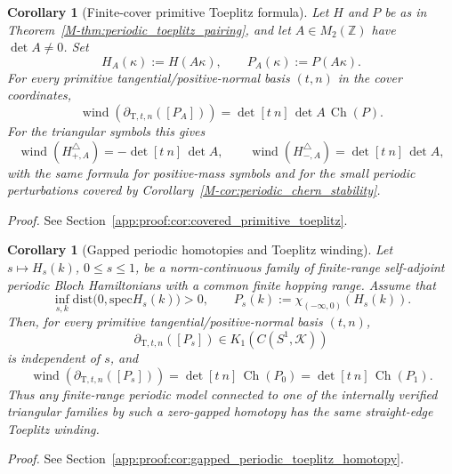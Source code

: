 \documentclass[11pt]{article}
\numberwithin{equation}{section}
\newtheorem{corollary}[theorem]{Corollary}
\theoremstyle{definition}
\theoremstyle{remark}
\newcommand{\proofref}[1]{%
  \par\noindent\emph{Proof.} See Section~\ref{#1}.\par\medskip
}
\newcommand{\proofappendixref}[1]{\proofref{#1}}
\newcommand{\spec}{\mathrm{spec}}
\newcommand{\dist}{\mathrm{dist}}
\newcommand{\Ch}{\operatorname{Ch}}
\begin{document}
\begin{corollary}[Finite-cover primitive Toeplitz formula]\label{cor:covered_primitive_toeplitz}
Let \(H\) and \(P\) be as in Theorem~\ref{M-thm:periodic_toeplitz_pairing}, and let
\(A\in M_2(\mathbb Z)\) have \(\det A\ne0\). Set
\[
H_A(\kappa):=H(A\kappa),\qquad P_A(\kappa):=P(A\kappa).
\]
For every primitive tangential/positive-normal basis \((t,n)\) in the cover coordinates,
\[
\operatorname{wind}\!\left(\partial_{\mathrm T,t,n}([P_A])\right)
=
\det[t\ n]\,\det A\,\Ch(P).
\]
For the triangular symbols this gives
\[
\operatorname{wind}(H^\triangle_{+,A})=-\det[t\ n]\,\det A,
\qquad
\operatorname{wind}(H^\triangle_{-,A})=\det[t\ n]\,\det A,
\]
with the same formula for positive-mass symbols and for the small periodic perturbations covered by
Corollary~\ref{M-cor:periodic_chern_stability}.
\end{corollary}
\proofappendixref{app:proof:cor:covered_primitive_toeplitz}





\begin{corollary}[Gapped periodic homotopies and Toeplitz winding]\label{cor:gapped_periodic_toeplitz_homotopy}
Let \(s\mapsto H_s(k)\), \(0\le s\le1\), be a norm-continuous family of finite-range self-adjoint
periodic Bloch Hamiltonians with a common finite hopping range. Assume that
\[
\inf_{s,k}\dist\bigl(0,\spec H_s(k)\bigr)>0,
\qquad
P_s(k):=\chi_{(-\infty,0)}(H_s(k)).
\]
Then, for every primitive tangential/positive-normal basis \((t,n)\),
\[
\partial_{\mathrm T,t,n}([P_s])\in K_1(C(S^1,\mathcal K))
\]
is independent of \(s\), and
\[
\operatorname{wind}\!\left(\partial_{\mathrm T,t,n}([P_s])\right)
=
\det[t\ n]\,\Ch(P_0)
=
\det[t\ n]\,\Ch(P_1).
\]
Thus any finite-range periodic model connected to one of the internally verified triangular
families by such a zero-gapped homotopy has the same straight-edge Toeplitz winding.
\end{corollary}
\proofappendixref{app:proof:cor:gapped_periodic_toeplitz_homotopy}
\end{document}
